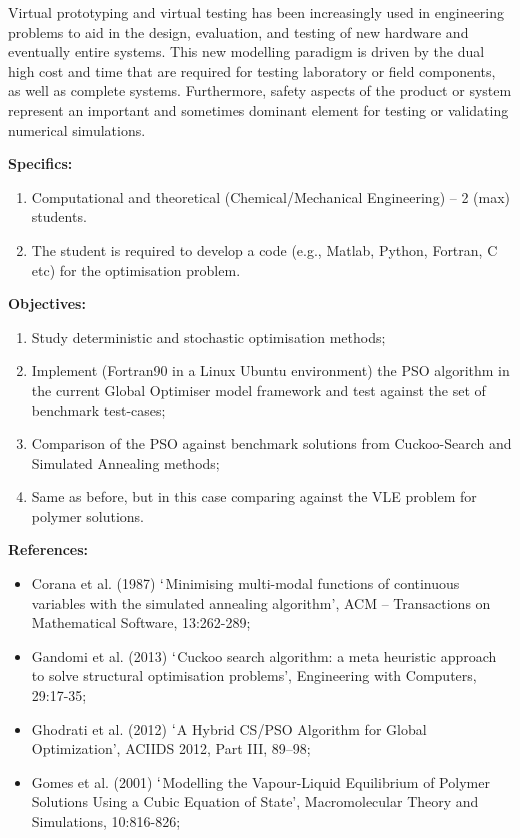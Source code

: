 \documentclass[12pts,a4paper,amsmath,amssymb,floatfix]{article}%
\newcommand{\Chem}{Chemical/Mechanical Engineering}
\begin{document}
\begin{enumerate}[label=\bfseries Project: \arabic*:]
Virtual prototyping and virtual testing has been increasingly used in engineering problems to aid in the design, evaluation, and testing of new hardware and eventually entire systems. This new modelling paradigm is driven by the dual high cost and time that are required for testing laboratory or field components, as well as complete systems. Furthermore, safety aspects of the product or system represent an important and sometimes dominant element for testing or validating numerical simulations.


\noindent
{\bf Specifics:} 
\begin{enumerate}
\item Computational and theoretical (\Chem) -- 2 (max) students. 
\item The student is required to develop a code (e.g., Matlab, Python, Fortran, C etc) for the optimisation problem.
\end{enumerate} 



\noindent
{\bf Objectives:}
\begin{enumerate}
\item Study deterministic and stochastic optimisation methods;
\item Implement (Fortran90 in a Linux Ubuntu environment) the PSO algorithm in the current Global Optimiser model framework and test against the set of benchmark test-cases;
\item Comparison of the PSO against benchmark solutions from Cuckoo-Search and Simulated Annealing methods;
\item Same as before, but in this case comparing against the VLE problem for polymer solutions.  
\end{enumerate}


\noindent
{\bf References:}
\begin{itemize}
\item Corana et al. (1987) $\lq$Minimising multi-modal functions of continuous variables with the simulated annealing algorithm', ACM -- Transactions on Mathematical Software, 13:262-289;
\item Gandomi et al. (2013) $\lq$Cuckoo search algorithm: a meta heuristic approach to solve structural optimisation problems', Engineering with Computers, 29:17-35;
\item Ghodrati et al. (2012) $\lq$A Hybrid CS/PSO Algorithm for Global Optimization', ACIIDS 2012, Part III, 89–98;
\item Gomes et al. (2001) $\lq$Modelling the Vapour-Liquid Equilibrium of Polymer Solutions Using a Cubic Equation of State', Macromolecular Theory and Simulations, 10:816-826;
\end{itemize}


\end{enumerate}
\end{document}
